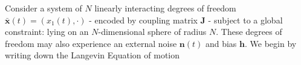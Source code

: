 Consider a system of $N$ linearly interacting degrees of freedom $\mathbf{\bar x}(t) = (x_1(t),\cdot)$ - encoded by coupling matrix $\mathbf{J}$ - subject to a global constraint: lying on an $N$-dimensional sphere of radius $N$. These degrees of freedom may also experience an external noise $\mathbf{n}(t)$ and bias $\mathbf{h}$. We begin by writing down the Langevin Equation of motion